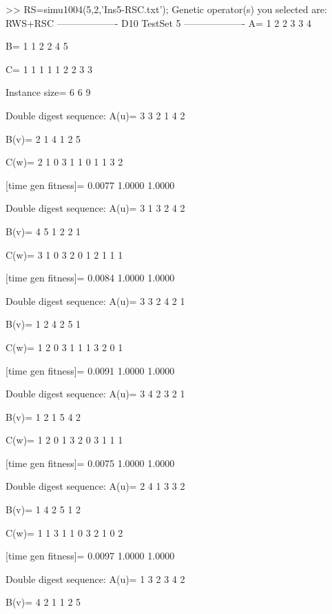 >> RS=simu1004(5,2,'Ins5-RSC.txt');
Genetic operator(s) you selected are:
RWS+RSC
------------------- D10 TestSet 5 -------------------
A=
     1     2     2     3     3     4

B=
     1     1     2     2     4     5

C=
     1     1     1     1     1     2     2     3     3

Instance size=
     6     6     9

Double digest sequence:
A(u)=
     3     3     2     1     4     2

B(v)=
     2     1     4     1     2     5

C(w)=
     2     1     0     3     1     1     0     1     1     3     2

[time gen fitness]=
    0.0077    1.0000    1.0000

Double digest sequence:
A(u)=
     3     1     3     2     4     2

B(v)=
     4     5     1     2     2     1

C(w)=
     3     1     0     3     2     0     1     2     1     1     1

[time gen fitness]=
    0.0084    1.0000    1.0000

Double digest sequence:
A(u)=
     3     3     2     4     2     1

B(v)=
     1     2     4     2     5     1

C(w)=
     1     2     0     3     1     1     1     3     2     0     1

[time gen fitness]=
    0.0091    1.0000    1.0000

Double digest sequence:
A(u)=
     3     4     2     3     2     1

B(v)=
     1     2     1     5     4     2

C(w)=
     1     2     0     1     3     2     0     3     1     1     1

[time gen fitness]=
    0.0075    1.0000    1.0000

Double digest sequence:
A(u)=
     2     4     1     3     3     2

B(v)=
     1     4     2     5     1     2

C(w)=
     1     1     3     1     1     0     3     2     1     0     2

[time gen fitness]=
    0.0097    1.0000    1.0000

Double digest sequence:
A(u)=
     1     3     2     3     4     2

B(v)=
     4     2     1     1     2     5

